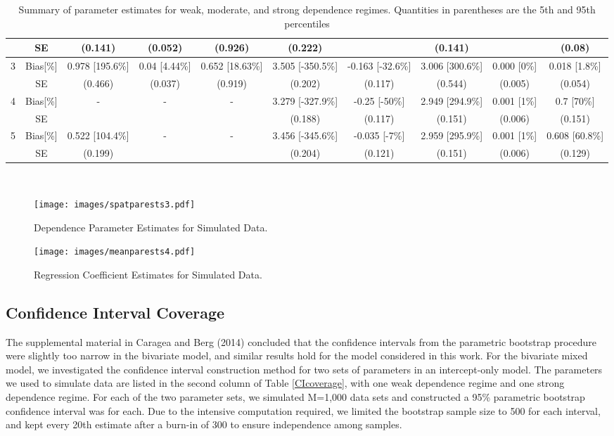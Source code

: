 \documentclass[12pt, a4paper, twoside]{article}
\begin{document}
\begin{sidewaystable}
\begin{table}[H]
{\begin{tabular}{|c||c||c||c||c||c||c||c||c||c|}
				& SE& (0.141) & (0.052) & (0.926) & (0.222) &  & (0.141) & & (0.08) \\
				\hline
				3 &Bias[\%]& 0.978 [195.6\%] & 0.04 [4.44\%] & 0.652 [18.63\%] & 3.505 [-350.5\%] & -0.163 [-32.6\%] & 3.006 [300.6\%] & 0.000 [0\%] & 0.018 [1.8\%] \\ 
				&SE& (0.466) & (0.037) & (0.919) & (0.202) & (0.117) & (0.544) & (0.005) & (0.054) \\ \hline
				4 &Bias[\%] & -& - & -& 3.279 [-327.9\%] & -0.25 [-50\%] & 2.949 [294.9\%] & 0.001 [1\%] & 0.7 [70\%] \\  
				&SE &  &  &  & (0.188) & (0.117) & (0.151) & (0.006) & (0.151) \\  \hline
				5 &Bias[\%] & 0.522 [104.4\%] & - & - & 3.456 [-345.6\%] & -0.035 [-7\%] & 2.959 [295.9\%] & 0.001 [1\%] & 0.608 [60.8\%] \\
				&SE & (0.199) &  & & (0.204) & (0.121) & (0.151) & (0.006) & (0.129) \\ 
				\hline
		\end{tabular}}\\
		\caption[Summary of MPLE estimates for simulated data]{Summary of parameter estimates for weak, moderate, and strong dependence regimes. Quantities in parentheses are the 5th and 95th percentiles}
		\label{EstResults}
	\end{table}
\end{sidewaystable}
\begin{figure}[H]
\centering
\texttt{[image: images/spatparests3.pdf]}
\caption{Dependence Parameter Estimates for Simulated Data.}
\label{spatests}
\vspace{.5cm}
\centering
\texttt{[image: images/meanparests4.pdf]}
\caption{Regression Coefficient Estimates for Simulated Data.}
\label{meanests}
\end{figure}

\subsection{Confidence Interval Coverage}\label{CISIM}
The supplemental material in Caragea and Berg (2014) concluded that the confidence intervals from the parametric bootstrap procedure were slightly too narrow in the bivariate model, and similar results hold for the model considered in this work. For the bivariate mixed model, we investigated the confidence interval construction method for two sets of parameters in an intercept-only model. The parameters we used to simulate data are listed in the second column of Table \ref{CIcoverage}, with one weak dependence regime and one strong dependence regime. For each of the two parameter sets,  we simulated M=1,000 data sets and constructed a 95\% parametric bootstrap confidence interval was for each. Due to the intensive computation required, we limited the bootstrap sample size to 500 for each interval, and kept every 20th estimate after a burn-in of 300 to ensure independence among samples.
\end{document}
